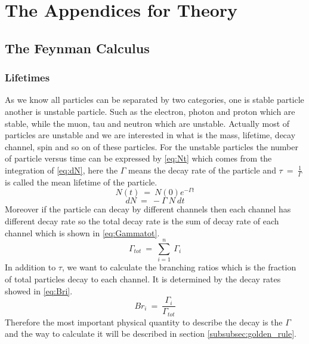 \chapter{The Appendices for Theory}\label{app:theory}
\section{The Feynman Calculus}\label{subsec:Feynman}
\subsection{Lifetimes}\label{subsubsec:Lifetime}
As we know all particles can be separated by two categories, one is stable particle another is unstable particle. Such as the electron, photon and proton which are stable, while the muon, tau and neutron which are unstable. Actually most of particles are unstable and we are interested in what is the mass, lifetime, decay channel, spin and so on of these particles.
For the unstable particles the number of particle versus time can be expressed by \ref{eq:Nt} which comes from the integration of \ref{eq:dN}, here the $\Gamma$ means the decay rate of the particle and $\tau~=~\frac{1}{\Gamma}$ is called the mean lifetime of the particle.
\begin{equation}
N(t)~=~N(0)e^{-\Gamma t}
\label{eq:Nt}
\end{equation}
\begin{equation}
dN~=~-\Gamma~N~dt
\label{eq:dN}
\end{equation}
Moreover if the particle can decay by different channels then each channel has different decay rate so the total decay rate is the sum of decay rate of each channel which is shown in \ref{eq:Gammatot}.
\begin{equation}
\Gamma_{tot}~=~\sum^{n}_{i=1}~\Gamma_{i}
\label{eq:Gammatot}
\end{equation}
In addition to $\tau$, we want to calculate the branching ratios which is the fraction of total particles decay to each channel. It is determined by the decay rates showed in \ref{eq:Bri}.
\begin{equation}
Br_{i}~=~\frac{\Gamma_{i}}{\Gamma_{tot}}
\label{eq:Bri}
\end{equation}
Therefore the most important physical quantity to describe the decay is the $\Gamma$ and the way to calculate it will be described in section \ref{subsubsec:golden_rule}.

